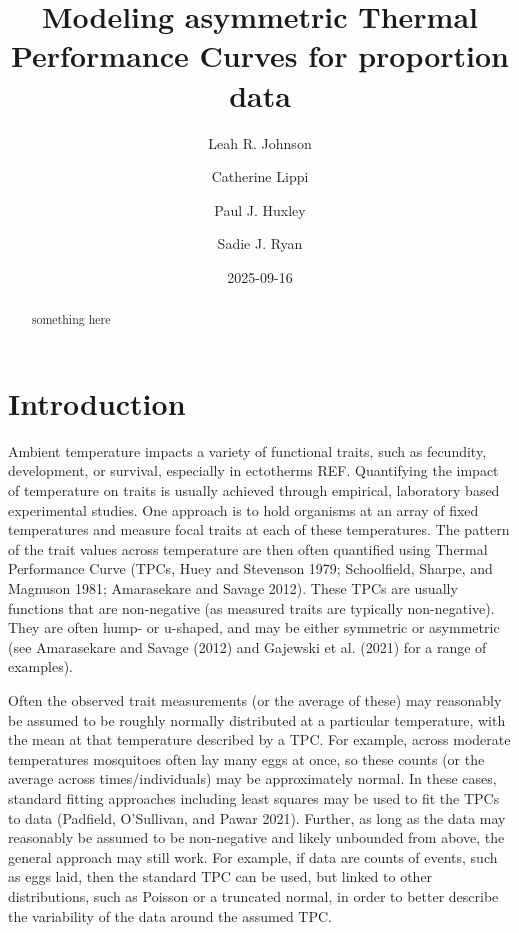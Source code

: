 \documentclass[
]{article}
\title{Modeling asymmetric Thermal Performance Curves for proportion
data}
\author{Leah R. Johnson \and Catherine Lippi \and Paul J.
Huxley \and Sadie J. Ryan}
\date{2025-09-16}
\begin{document}
\maketitle
\begin{abstract}
something here
\end{abstract}

\section{Introduction}\label{introduction}

Ambient temperature impacts a variety of functional traits, such as
fecundity, development, or survival, especially in ectotherms REF.
Quantifying the impact of temperature on traits is usually achieved
through empirical, laboratory based experimental studies. One approach
is to hold organisms at an array of fixed temperatures and measure focal
traits at each of these temperatures. The pattern of the trait values
across temperature are then often quantified using Thermal Performance
Curve (TPCs, Huey and Stevenson 1979; Schoolfield, Sharpe, and Magnuson
1981; Amarasekare and Savage 2012). These TPCs are usually functions
that are non-negative (as measured traits are typically non-negative).
They are often hump- or u-shaped, and may be either symmetric or
asymmetric (see Amarasekare and Savage (2012) and Gajewski et al. (2021)
for a range of examples).

Often the observed trait measurements (or the average of these) may
reasonably be assumed to be roughly normally distributed at a particular
temperature, with the mean at that temperature described by a TPC. For
example, across moderate temperatures mosquitoes often lay many eggs at
once, so these counts (or the average across times/individuals) may be
approximately normal. In these cases, standard fitting approaches
including least squares may be used to fit the TPCs to data (Padfield,
O'Sullivan, and Pawar 2021). Further, as long as the data may reasonably
be assumed to be non-negative and likely unbounded from above, the
general approach may still work. For example, if data are counts of
events, such as eggs laid, then the standard TPC can be used, but linked
to other distributions, such as Poisson or a truncated normal, in order
to better describe the variability of the data around the assumed TPC.
\end{document}

